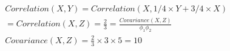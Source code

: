 \documentclass{article}
\begin{document}
\fontsize{15pt}{20pt}\selectfont

\begin{CJK}{UTF8}{bsmi} %
\noindent

\begin{align*}
& Correlation(X,Y)= Correlation(X, 1/4 \times Y + 3/4 \times X)\\
& = Correlation(X,Z) =  \frac{2}{3} = \frac{Covariance(X, Z)}{\phi_1\phi_2} \\
& Covariance(X, Z) = \frac{2}{3} \times 3 \times 5 = 10
\end{align*}

\end{CJK} %
\end{document}
